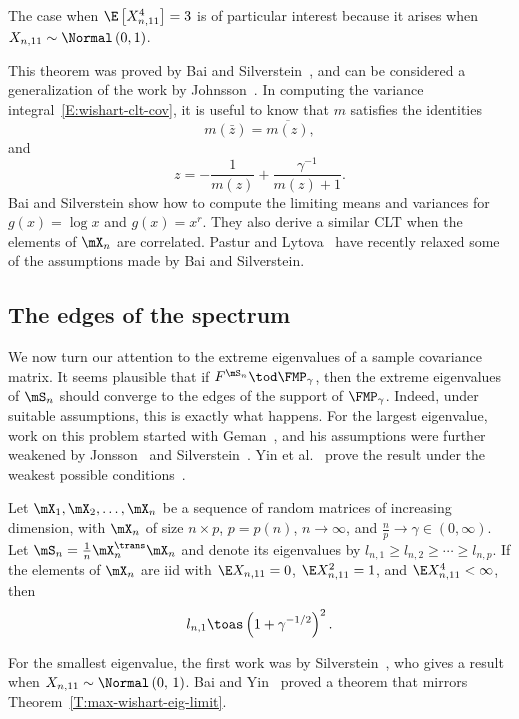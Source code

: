 \noindent
The case when $\E\left[ X_{n,11}^4 \right] = 3$ is of particular interest
because it arises when $X_{n,11} \sim \Normal\left( 0, 1 \right)$.

This theorem was proved by Bai and Silverstein~\cite{bai2004clt}, and can
be considered a generalization of the work by Johnsson~\cite{jonsson1982slt}.
In computing the variance integral~\eqref{E:wishart-clt-cov}, it is useful to know that $m$ satisfies
the identities 
\[
    m(\bar z) = \overline{m (z) },
\]
and
\[
    z = - \frac{1}{m(z)} + \frac{\gamma^{-1}}{m(z) + 1}.
\]
Bai and Silverstein show how to compute the limiting means and variances
for $g(x) = \log x$ and $g(x) = x^r$.  They also derive a similar CLT when
the elements of $\mX_n$ are correlated.  Pastur and Lytova~\cite{pastur2008clt} have recently relaxed some of the assumptions made by Bai and Silverstein.


\subsection{The edges of the spectrum}

We now turn our attention to the extreme eigenvalues of a sample covariance
matrix.  It seems plausible that if $F^{\mS_n} \tod \FMP_\gamma$, then the
extreme eigenvalues of $\mS_n$ should converge to the edges of the support
of $\FMP_\gamma$.  Indeed, under suitable assumptions, this is exactly what
happens.  For the largest eigenvalue, work on this problem started with Geman~\cite{geman1980ltn}, and his assumptions were further weakened by Jonsson~\cite{jonsson1983ole} and Silverstein~\cite{silverstein1984ole}.
Yin et al.~\cite{yin1988lle} prove the result under the weakest possible
conditions~\cite{bai1988nle}.

\begin{theorem}\label{T:max-wishart-eig-limit}
    Let $\mX_1, \mX_2, \ldots, \mX_n$ be a sequence of random matrices of
    increasing dimension, with $\mX_n$ of size $n \times p$, $p = p(n)$, 
    $n \to \infty$, and
    $\frac{n}{p} \to \gamma \in (0,\infty)$.  Let $\mS_n = \frac{1}{n} \mX_n^\trans \mX_n$ and 
    denote its eigenvalues by 
    $l_{n,1} \geq l_{n,2} \geq \cdots \geq l_{n,p}$.  If the 
    elements of $\mX_n$ are 
    iid with $\E X_{n,11} = 0$, $\E X_{n,11}^2 = 1$, and
    $\E X_{n,11}^4 < \infty$, then
    \[
        l_{n,1} \toas \left( 1 + \gamma^{-1/2} \right)^2.
    \]
\end{theorem}

For the smallest eigenvalue, the first work was by Silverstein~\cite{silverstein1985sel}, who gives a result when 
$X_{n,11} \sim \Normal\left( 0,\, 1 \right)$.  Bai and Yin~\cite{bai1993lse} proved a theorem that mirrors Theorem~\ref{T:max-wishart-eig-limit}.

